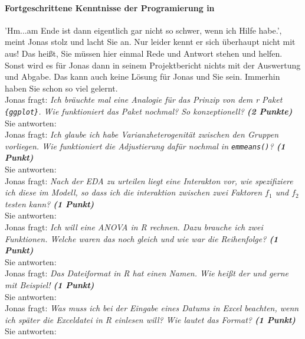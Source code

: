 \documentclass[a4paper, 9pt]{scrartcl}\usepackage[]{graphicx}\usepackage[]{xcolor}
\begin{document}
\ifcollection
\paragraph{Fortgeschrittene Kenntnisse der Programierung in \Rlogo}
\fi

'Hm...am Ende ist dann \Rlogo eigentlich gar nicht so schwer, wenn ich Hilfe habe.', meint  Jonas stolz und lacht Sie an. Nur leider kennt er sich überhaupt nicht mit \Rlogo aus! Das heißt, Sie müssen hier einmal Rede und Antwort stehen und helfen. Sonst wird es für Jonas dann in seinem Projektbericht nichts mit der Auswertung und Abgabe. Das kann auch keine Lösung für Jonas und Sie sein. Immerhin haben Sie schon so viel gelernt.\\[1Ex]

Jonas fragt: \textit{Ich bräuchte mal eine Analogie für das Prinzip von dem r Paket \texttt{\{ggplot\}}. Wie funktioniert das Paket nochmal? So konzeptionell? \textbf{(2 Punkte)}}\\[1ex]
Sie antworten:\\[6.5Ex]

Jonas fragt: \textit{Ich glaube ich habe Varianzheterogenität zwischen den Gruppen vorliegen. Wie funktioniert die Adjustierung dafür nochmal in  \texttt{emmeans()}? \textbf{(1 Punkt)}}\\[1ex]
Sie antworten:\\[6.5Ex]

Jonas fragt: \textit{Nach der EDA zu urteilen liegt eine Interakton vor, wie spezifiziere ich diese im Modell, so dass ich die interaktion zwischen zwei Faktoren $f_1$ und $f_2$ testen kann? \textbf{(1 Punkt)}}\\[1ex]
Sie antworten:\\[6.5Ex]

Jonas fragt: \textit{Ich will eine ANOVA in R rechnen. Dazu brauche ich zwei Funktionen. Welche waren das noch gleich und wie war die Reihenfolge? \textbf{(1 Punkt)}}\\[1ex]
Sie antworten:\\[6.5Ex]

Jonas fragt: \textit{Das Dateiformat in R hat einen Namen. Wie heißt der und gerne mit Beispiel! \textbf{(1 Punkt)}}\\[1ex]
Sie antworten:\\[6.5Ex]

Jonas fragt: \textit{Was muss ich bei der Eingabe eines Datums in Excel beachten, wenn ich später die Exceldatei in R einlesen will? Wie lautet das Format? \textbf{(1 Punkt)}}\\[1ex]
Sie antworten:\\[6.5Ex]
\end{document}
